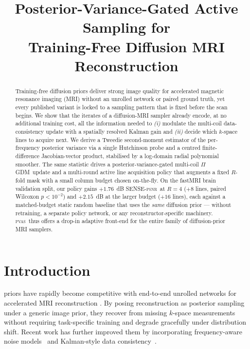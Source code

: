 \documentclass[conference]{IEEEtran}
\title{Posterior-Variance-Gated Active Sampling for\\
       Training-Free Diffusion {MRI} Reconstruction}
\author{}
\newcommand{\PSNR}{\textsc{psnr}}
\newcommand{\PIGDM}{$\Pi$GDM}
\newcommand{\PVAS}{\textsc{pvas}}
\begin{document}
\maketitle

\begin{abstract}
Training-free diffusion priors deliver strong image quality for
accelerated magnetic resonance imaging (MRI) without an unrolled
network or paired ground truth, yet every published variant is
locked to a sampling pattern that is fixed before the scan begins.
We show that the iterates of a diffusion-MRI sampler already encode,
at no additional training cost, all the information needed to
\emph{(i)} modulate the multi-coil data-consistency update with a
spatially resolved Kalman gain and \emph{(ii)} decide which $k$-space
lines to acquire next. We derive a Tweedie second-moment estimator of
the per-frequency posterior variance via a single Hutchinson probe and
a centred finite-difference Jacobian-vector product, stabilised by a
log-domain radial polynomial smoother. The same statistic drives a
posterior-variance-gated multi-coil \PIGDM\ update and a multi-round
active line acquisition policy that augments a fixed $R$-fold mask
with a small column budget chosen on-the-fly. On the fastMRI brain
validation split, our policy gains $+1.76$~dB SENSE-\PSNR\ at $R{=}4$
($+8$ lines, paired Wilcoxon $p{<}10^{-2}$) and $+2.15$~dB at the
larger budget ($+16$ lines), each against a matched-budget static
random baseline that uses the \emph{same} diffusion prior --- without
retraining, a separate policy network, or any reconstructor-specific
machinery. \PVAS\ thus offers a drop-in adaptive front-end for the
entire family of diffusion-prior MRI samplers.
\end{abstract}

\section{Introduction}\label{sec:intro}
 priors have rapidly become competitive with
end-to-end unrolled networks for accelerated MRI reconstruction
\cite{jalal2021robust,chung2022scoremri,song2023pigdm,chung2023dps,peng2024optimal}.
By posing reconstruction as posterior sampling under a generic image
prior, they recover from missing $k$-space measurements without
requiring task-specific training and degrade gracefully under
distribution shift. Recent work has further improved them by
incorporating frequency-aware noise models~\cite{laroche2024fastdiffem}
and Kalman-style data consistency~\cite{ours2025}.
\end{document}
